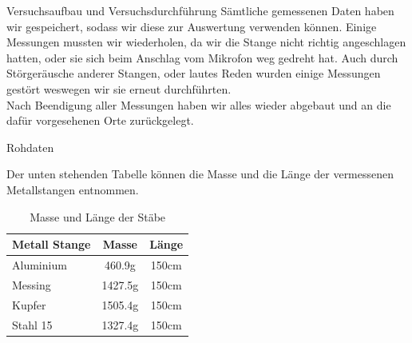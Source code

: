 \documentclass[twoside]{protokoll}
\begin{document}
\begin{aufgabe}{Versuchsaufbau und Versuchsdurchführung}
Sämtliche gemessenen Daten haben wir gespeichert, sodass wir diese zur Auswertung verwenden können. Einige Messungen mussten wir wiederholen, da wir die Stange nicht richtig angeschlagen hatten, oder sie sich beim Anschlag vom Mikrofon weg gedreht hat. Auch durch Störgeräusche anderer Stangen, oder lautes Reden wurden einige Messungen gestört weswegen wir sie erneut durchführten.\\

Nach Beendigung aller Messungen haben wir alles wieder abgebaut und an die dafür vorgesehenen Orte zurückgelegt. 


\end{aufgabe}

\begin{aufgabe}{Rohdaten}

Der unten stehenden Tabelle können die Masse und die Länge der vermessenen Metallstangen entnommen. \\
    \begin{table}[H]
        \centering
        \begin{tabularx}{0.8\textwidth}{X c c} %
            \toprule
            \textbf{Metall Stange} & \textbf{Masse} & \textbf{Länge} \\
            \midrule
            Aluminium & 460.9g & 150cm \\
            Messing & 1427.5g & 150cm \\
            Kupfer & 1505.4g & 150cm \\
            Stahl 15 & 1327.4g & 150cm \\
            \bottomrule
        \end{tabularx}
        \caption{Masse und Länge der Stäbe}
        \label{tab:mytable}
    \end{table}


\end{aufgabe}
\end{document}
